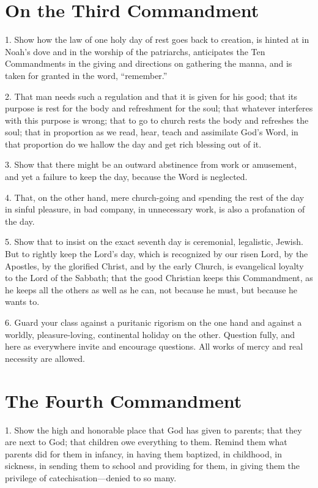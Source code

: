 \section{On the Third Commandment}

 1. Show how the law of one holy day of rest goes back to creation, is hinted at in Noah’s dove and in the worship of the patriarchs, anticipates the Ten Commandments in the giving and directions on gathering the manna, and is taken for granted in the word, “remember.”

 2. That man needs such a regulation and that it is given for his good; that its purpose is rest for the body and refreshment for the soul; that whatever interferes with this purpose is wrong; that to go to church rests the body and refreshes the soul; that in proportion as we read, hear, teach and assimilate God’s Word, in that proportion do we hallow the day and get rich blessing out of it.

 3. Show that there might be an outward abstinence from work or amusement, and yet a failure to keep the day, because the Word is neglected.

 4. That, on the other hand, mere church-going and spending the rest of the day in sinful pleasure, in bad company, in unnecessary work, is also a profanation of the day.

 5. Show that to insist on the exact seventh day is ceremonial, legalistic, Jewish. But to rightly keep the Lord’s day, which is recognized by our risen Lord, by the Apostles, by the glorified Christ, and by the early Church, is evangelical loyalty to the Lord of the Sabbath; that the good Christian keeps this Commandment, as he keeps all the others as well as he can, not because he must, but because he wants to.

6. Guard your class against a puritanic rigorism on the one hand and against a worldly, pleasure-loving, continental holiday on the other. Question fully, and here as everywhere invite and encourage questions. All works of mercy and real necessity are allowed.

\section{The Fourth Commandment}

1. Show the high and honorable place that God has given to parents; that they are next to God; that children owe everything to them. Remind them what parents did for them in infancy, in having them baptized, in childhood, in sickness, in sending
them to school and providing for them, in giving them the privilege of catechisation—denied to so many.

